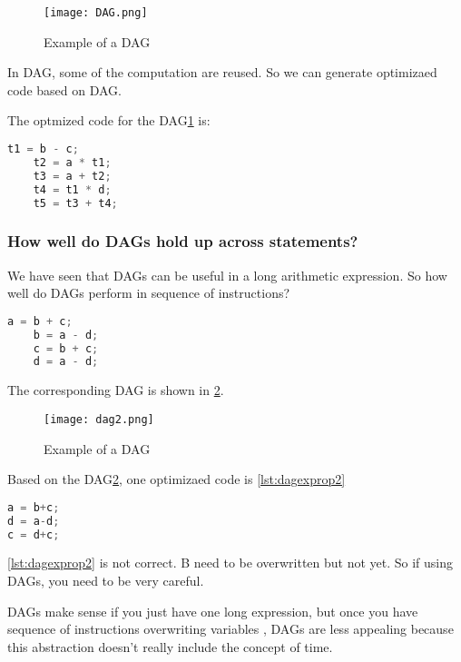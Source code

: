 \begin{figure}[h]
    \centering
    \texttt{[image: DAG.png]}
    \caption{Example of a DAG}
    \label{fig:DAG}
\end{figure}



In DAG, some of the computation are reused. So we can generate optimizaed code based on DAG.

The optmized code for the DAG\ref{fig:DAG} is: 

\begin{lstlisting}[language=C, frame=single,caption=code ,label=lst:dag]
    t1 = b - c;
    t2 = a * t1;
    t3 = a + t2;
    t4 = t1 * d;
    t5 = t3 + t4;
\end{lstlisting}


\subsubsection{How well do DAGs hold up across statements?}

We have seen that DAGs can be useful in a long arithmetic expression. So how well do DAGs
perform in sequence of instructions?

\begin{lstlisting}[language=C, frame=single,caption=code ,label=lst:dagexpr2]
    a = b + c;
    b = a - d;
    c = b + c;
    d = a - d;
\end{lstlisting}


The corresponding DAG is shown in \ref{fig:DAG2}.
\begin{figure}[h]
    \centering
    \texttt{[image: dag2.png]}
    \caption{Example of a DAG}
    \label{fig:DAG2}
\end{figure}

Based on the DAG\ref{fig:DAG2}, one optimizaed code is \ref{lst:dagexprop2}


\begin{lstlisting}[language=C, frame=single,caption=code ,label=lst:dagexprop2]
a = b+c;
d = a-d;
c = d+c;
\end{lstlisting}

\ref{lst:dagexprop2} is not correct. B need to be overwritten but not yet. So if using DAGs, you need to be 
very careful. 

DAGs make sense if you just have one long expression, but once you have sequence of instructions overwriting variables
, DAGs are less appealing because this abstraction doesn't really include the concept of time.




